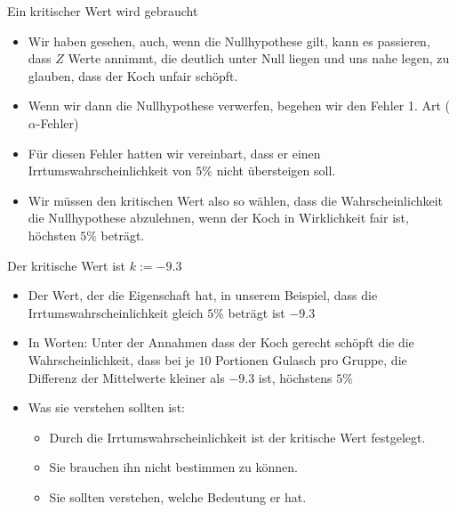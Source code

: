 \documentclass[usenames,dvipsnames,handout]{beamer}
\begin{document}
\begin{frame}{Ein kritischer Wert wird gebraucht}
\begin{itemize}
\item{Wir haben gesehen, auch, wenn die Nullhypothese gilt, kann es passieren, dass $Z$ Werte annimmt, die deutlich 
unter Null liegen und uns nahe legen, zu glauben, dass der Koch unfair schöpft.}\pause
\item{Wenn wir dann die Nullhypothese verwerfen, begehen wir den Fehler 1. Art ($\alpha$-Fehler)}\pause
\item{Für diesen Fehler hatten wir vereinbart, dass er einen Irrtumswahrscheinlichkeit von $5\%$ nicht übersteigen soll.}\pause
\item{Wir müssen den kritischen Wert also so wählen, dass die Wahrscheinlichkeit die Nullhypothese abzulehnen, wenn der Koch
in Wirklichkeit fair ist, höchsten $5\%$ beträgt.}
\end{itemize}
\end{frame}

\begin{frame}{Der kritische Wert ist $k:=-9.3$}
\begin{itemize}
\item{Der Wert, der die Eigenschaft hat, in unserem Beispiel, dass die Irrtumswahrscheinlichkeit gleich $5\%$ beträgt ist $-9.3$}\pause
\item{In Worten: Unter der Annahmen dass der Koch gerecht schöpft die die Wahrscheinlichkeit, dass bei je $10$ Portionen
Gulasch pro Gruppe, die Differenz der Mittelwerte kleiner als $-9.3$ ist, höchstens $5\%$}\pause
\item{Was sie verstehen sollten ist: }
\begin{itemize}
\item{Durch die Irrtumswahrscheinlichkeit ist der kritische Wert festgelegt.}
\item{Sie brauchen ihn nicht bestimmen zu können.}
\item{Sie sollten verstehen, welche Bedeutung er hat.}
\end{itemize}
\end{itemize}
\end{frame}
\end{document}
